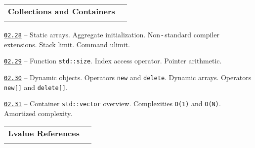 \documentclass[a4paper,12pt]{article}
\renewenvironment{itemize}
{
    \begin{list}{\labelitemi}
    {
      \setlength{\topsep}{0pt}
      \setlength{\partopsep}{0pt}
      \setlength{\parskip}{0pt}
      \setlength{\itemsep}{0pt}
      \setlength{\parsep}{0pt}
      \setlength{\leftmargin}{14.5pt}
    }
}{\end{list}}
\begin{document}
\bigskip\medskip

\begin{tabular}{!{\vrule width 1pt}L{5.3cm}!{\vrule width 1pt}L{13.7cm}!{\vrule width 0pt}} 


\textbf{Collections and Containers} & \\


\end{tabular}

\medskip\smallskip

\begin{itemize}

    \item \href{https://github.com/i-s-m-mipt/Education/blob/master/projects/examples/source/02.28.cpp}{\texttt{02.28}} -- Static arrays. Aggregate initialization. Non\,-\,standard compiler extensions. Stack limit. Command ulimit.

    \smallskip

    \item \href{https://github.com/i-s-m-mipt/Education/blob/master/projects/examples/source/02.29.cpp}{\texttt{02.29}} -- Function \lstinline{std::size}. Index access operator. Pointer arithmetic.

    \smallskip

    \item \href{https://github.com/i-s-m-mipt/Education/blob/master/projects/examples/source/02.30.cpp}{\texttt{02.30}} -- Dynamic objects. Operators \lstinline{new} and \lstinline{delete}. Dynamic arrays. Operators \lstinline{new[]} and \lstinline{delete[]}.

    \smallskip

    \item \href{https://github.com/i-s-m-mipt/Education/blob/master/projects/examples/source/02.31.cpp}{\texttt{02.31}} -- Container \lstinline{std::vector} overview. Complexities \texttt{O(1)} and \texttt{O(N)}. Amortized complexity.

\end{itemize}

\bigskip\medskip

\begin{tabular}{!{\vrule width 1pt}L{3.6cm}!{\vrule width 1pt}L{15.4cm}!{\vrule width 0pt}} 


\textbf{Lvalue References} & \\


\end{tabular}
\end{document}
